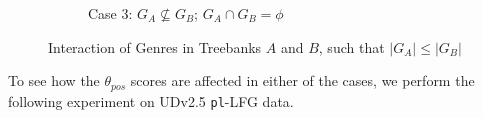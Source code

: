 \begin{figure}[H]
\begin{subfigure}{.5\textwidth}
        \label{fig:case 2 ga gb}
    \end{subfigure}
    \newline
    \begin{subfigure}{\textwidth}
        \centering
        \caption{Case 3: $G_{A} \not \subseteq G_{B}$; $G_{A} \cap G_{B} = \phi$}
        \label{fig:case 3 ga gb}
    \end{subfigure}
    \caption{Interaction of Genres in Treebanks $A$ and $B$, such that $\vert G_{A} \vert \leq \vert G_{B} \vert$}
    \label{fig:GA and GB interactions}
\end{figure}

To see how the $\theta_{pos}$ scores are affected in either of the cases, we perform the following experiment on UDv2.5 \texttt{pl}-LFG data.

